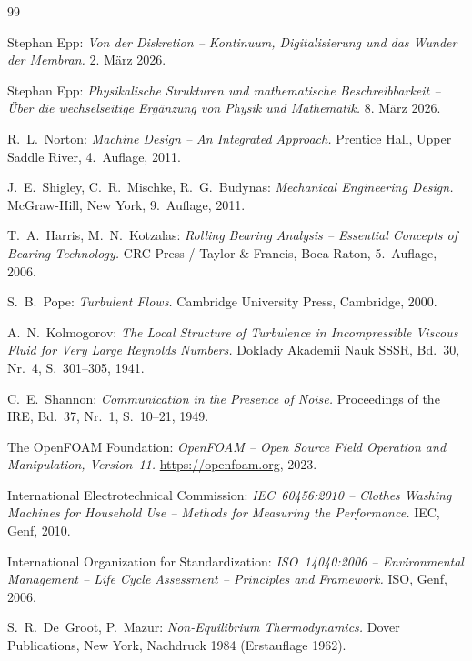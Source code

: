 ﻿\documentclass[12pt,a4paper]{article}
\theoremstyle{remark}
\begin{document}
	\begin{thebibliography}{99}
	
	Stephan Epp:
	\textit{Von der Diskretion -- Kontinuum, Digitalisierung und das Wunder der Membran.} 2. März 2026.
	
	Stephan Epp:
	\textit{Physikalische Strukturen und mathematische Beschreibbarkeit --
	Über die wechselseitige Ergänzung von Physik und Mathematik.} 8. März 2026.
	
	R.~L.~Norton:
	\textit{Machine Design -- An Integrated Approach.}
	Prentice Hall, Upper Saddle River, 4.~Auflage, 2011.
	
	J.~E.~Shigley, C.~R.~Mischke, R.~G.~Budynas:
	\textit{Mechanical Engineering Design.}
	McGraw-Hill, New York, 9.~Auflage, 2011.
	
	T.~A.~Harris, M.~N.~Kotzalas:
	\textit{Rolling Bearing Analysis -- Essential Concepts of Bearing Technology.}
	CRC Press / Taylor \& Francis, Boca Raton, 5.~Auflage, 2006.
	
	S.~B.~Pope:
	\textit{Turbulent Flows.}
	Cambridge University Press, Cambridge, 2000.
	
	A.~N.~Kolmogorov:
	\textit{The Local Structure of Turbulence in Incompressible Viscous Fluid for Very Large Reynolds Numbers.}
	Doklady Akademii Nauk SSSR, Bd.~30, Nr.~4, S.~301--305, 1941.
	
	C.~E.~Shannon:
	\textit{Communication in the Presence of Noise.}
	Proceedings of the IRE, Bd.~37, Nr.~1, S.~10--21, 1949.
	
	The OpenFOAM Foundation:
	\textit{OpenFOAM -- Open Source Field Operation and Manipulation, Version~11.}
	\url{https://openfoam.org}, 2023.
	
	International Electrotechnical Commission:
	\textit{IEC~60456:2010 -- Clothes Washing Machines for Household Use --
	Methods for Measuring the Performance.}
	IEC, Genf, 2010.
	
	International Organization for Standardization:
	\textit{ISO~14040:2006 -- Environmental Management -- Life Cycle Assessment --
	Principles and Framework.}
	ISO, Genf, 2006.
	
	S.~R.~De~Groot, P.~Mazur:
	\textit{Non-Equilibrium Thermodynamics.}
	Dover Publications, New York, Nachdruck 1984 (Erstauflage 1962).
	

\end{thebibliography}
\end{document}
